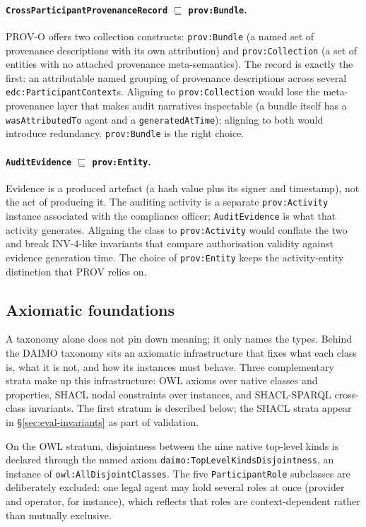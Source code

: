 \documentclass[Afour,sagev,times]{sagej}
\newcommand{\code}[1]{\texttt{#1}}
\begin{document}
\paragraph{\code{CrossParticipantProvenanceRecord} $\sqsubseteq$ \code{prov:Bundle}.} PROV-O offers two collection constructs: \code{prov:Bundle} (a named set of provenance descriptions with its own attribution) and \code{prov:Collection} (a set of entities with no attached provenance meta-semantics). The record is exactly the first: an attributable named grouping of provenance descriptions across several \code{edc:ParticipantContext}s. Aligning to \code{prov:Collection} would lose the meta-provenance layer that makes audit narratives inspectable (a bundle itself has a \code{wasAttributedTo} agent and a \code{generatedAtTime}); aligning to both would introduce redundancy. \code{prov:Bundle} is the right choice.

\paragraph{\code{AuditEvidence} $\sqsubseteq$ \code{prov:Entity}.} Evidence is a produced artefact (a hash value plus its signer and timestamp), not the act of producing it. The auditing activity is a separate \code{prov:Activity} instance associated with the compliance officer; \code{AuditEvidence} is what that activity generates. Aligning the class to \code{prov:Activity} would conflate the two and break INV-4-like invariants that compare authorisation validity against evidence generation time. The choice of \code{prov:Entity} keeps the activity-entity distinction that PROV relies on.

\subsection{Axiomatic foundations}\label{sec:axiomatic}

A taxonomy alone does not pin down meaning; it only names the types. Behind the DAIMO taxonomy sits an axiomatic infrastructure that fixes what each class is, what it is not, and how its instances must behave. Three complementary strata make up this infrastructure: OWL axioms over native classes and properties, SHACL nodal constraints over instances, and SHACL-SPARQL cross-class invariants. The first stratum is described below; the SHACL strata appear in §\ref{sec:eval-invariants} as part of validation.

On the OWL stratum, disjointness between the nine native top-level kinds is declared through the named axiom \code{daimo:TopLevelKindsDisjointness}, an instance of \code{owl:AllDisjointClasses}. The five \code{ParticipantRole} subclasses are deliberately excluded: one legal agent may hold several roles at once (provider and operator, for instance), which reflects that roles are context-dependent rather than mutually exclusive.
\end{document}
